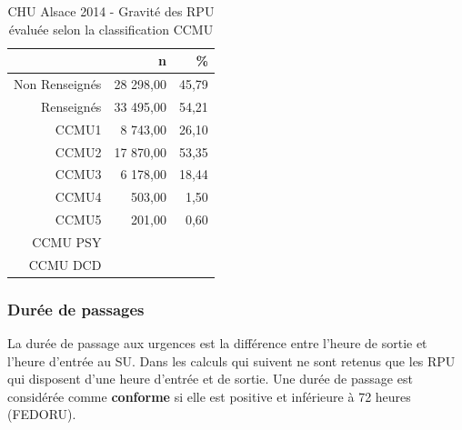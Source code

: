 \documentclass[]{article}
\begin{document}
\begin{itemize}
  \begin{table}[ht]
  \centering
  \begin{tabular}{rrr}
    \hline
   & n & \% \\ 
    \hline
  Non Renseignés & 28 298,00 & 45,79 \\ 
    Renseignés & 33 495,00 & 54,21 \\ 
    CCMU1 & 8 743,00 & 26,10 \\ 
    CCMU2 & 17 870,00 & 53,35 \\ 
    CCMU3 & 6 178,00 & 18,44 \\ 
    CCMU4 & 503,00 & 1,50 \\ 
    CCMU5 & 201,00 & 0,60 \\ 
    CCMU PSY &  &  \\ 
    CCMU DCD &  &  \\ 
     \hline
  \end{tabular}
  \caption{CHU Alsace 2014 - Gravité des RPU évaluée selon la classification CCMU} 
  \end{table}
\end{itemize}

\subsubsection{Durée de passages}\label{duree-de-passages}

La durée de passage aux urgences est la différence entre l'heure de
sortie et l'heure d'entrée au SU. Dans les calculs qui suivent ne sont
retenus que les RPU qui disposent d'une heure d'entrée et de sortie. Une
durée de passage est considérée comme \textbf{conforme} si elle est
positive et inférieure à 72 heures (FEDORU).
\end{document}
